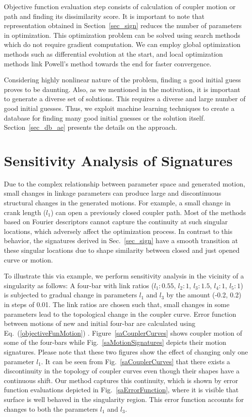 \documentclass[twocolumn,10pt]{asme2ej}
\newcommand{\req}[1]{(\ref{#1})}
\begin{document}
Objective function evaluation step consists of calculation of coupler motion or path and finding its dissimilarity score.
It is important to note that representation obtained in Section~\ref{sec_sign} reduces the number of parameters in optimization.
This optimization problem can be solved using search methods which do not require gradient computation.
We can employ global optimization methods such as differential evolution at the start, and local optimization methods link Powell's method towards the end for faster convergence\cite{ullah1997}.

Considering highly nonlinear nature of the problem, finding a good initial guess proves to be daunting.
Also, as we mentioned in the motivation, it is important to generate a diverse set of solutions.
This requires a diverse and large number of good initial guesses.
Thus, we exploit machine learning techniques to create a database for finding many good initial guesses or the solution itself.
Section~\ref{sec_db_ae} presents the details on the approach.


\section{Sensitivity Analysis of Signatures}\label{sec_SA}
Due to the complex relationship between parameter space and generated motion, small changes in linkage parameters can produce large and discontinuous structural changes in the generated motions.
For example, a small change in crank length ($l_1$) can open a previously closed coupler path.
Most of the methods based on Fourier descriptors cannot capture the continuity at such singular locations, which adversely affect the optimization process.
In contrast to this behavior, the signatures derived in Sec.~\ref{sec_sign} have a smooth transition at these singular locations due to shape similarity between closed and just opened curve or motion.

To illustrate this via example, we perform sensitivity analysis in the vicinity of a singularity as follows:
A four-bar with link ratios ($l_1:0.55$, $l_2:1$, $l_3:1.5$, $l_4:1$, $l_5:1$) is subjected to gradual change in parameters $l_1$ and $l_3$ by the amount (-0.2, 0.2) in steps of 0.01.
The link ratios are chosen such that, small changes in some parameters lead to the topological change in the coupler curve.
Error function between motions of new and initial four-bar are calculated using Eq.~\req{objectiveFunMotion} .
Figure~\ref{saCouplerCurves} shows coupler motion of some of the four-bars while Fig.~\ref{saMotionSignatures} depicts their motion signatures. Please note that these two figures show the effect of changing only one parameter $l_1$.
It can be seen from Fig.~\ref{saCouplerCurves} that there exists a discontinuity in the topology of coupler curves even though their shapes have a continuous shift.
Our method captures this continuity, which is shown by error function evaluations depicted in Fig.~\ref{saErrorFunction}, where it is visible that surface is well behaved in the singularity region. This error function accounts for changes to both the parameters $l_1$ and $l_3$.
\end{document}
